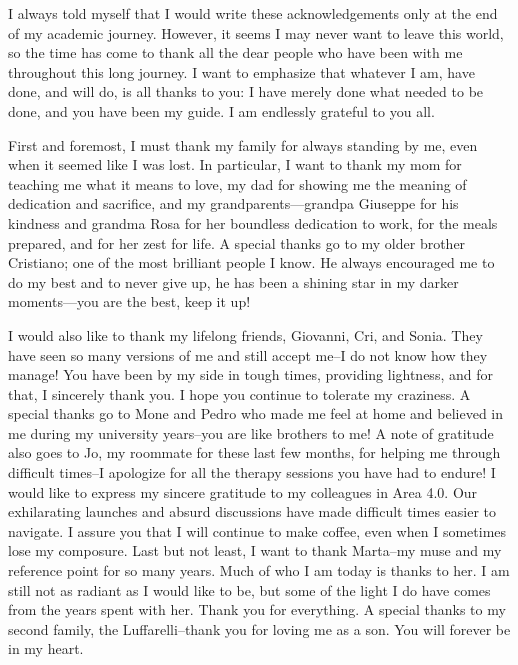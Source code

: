 I always told myself that I would write these acknowledgements only at the end of my academic journey.
 However, it seems I may never want to leave this world, 
 so the time has come to thank all the dear people who have been with me throughout this long journey. 
 I want to emphasize that whatever I am, have done, and will do, is all thanks to you: 
 I have merely done what needed to be done, and you have been my guide. 
 I am endlessly grateful to you all.

First and foremost, 
 I must thank my family for always standing by me, 
 even when it seemed like I was lost. 
 In particular, I want to thank my mom for teaching me what it means to love, 
 my dad for showing me the meaning of dedication and sacrifice, 
 and my grandparents—grandpa Giuseppe for his kindness and grandma Rosa for her boundless dedication to work, for the meals prepared, and for her zest for life. 
 A special thanks go to my older brother Cristiano; 
 one of the most brilliant people I know.
 He always encouraged me to do my best and to never give up, 
 he has been a shining star in my darker moments—you are the best, keep it up!

I would also like to thank my lifelong friends, 
 Giovanni, Cri, and Sonia. 
 They have seen so many versions of me and still accept me--I do not know how they manage! 
 You have been by my side in tough times, providing lightness, and for that, I sincerely thank you. 
 I hope you continue to tolerate my craziness.
%
A special thanks go to Mone and Pedro who made me feel at home and believed in me during my university years--you are like brothers to me! 
%
A note of gratitude also goes to Jo, 
 my roommate for these last few months, 
 for helping me through difficult times--I apologize for all the therapy sessions you have had to endure!
%
I would like to express my sincere gratitude to my colleagues in Area 4.0. 
 Our exhilarating launches and absurd discussions have made difficult times easier to navigate. 
 I assure you that I will continue to make coffee, even when I sometimes lose my composure.
%
Last but not least, I want to thank Marta--my muse and my reference point for so many years. 
 Much of who I am today is thanks to her. 
 I am still not as radiant as I would like to be,
 but some of the light I do have comes from the years spent with her. 
 Thank you for everything.
%
A special thanks to my second family, the Luffarelli--thank you for loving me as a son. 
 You will forever be in my heart.
%

